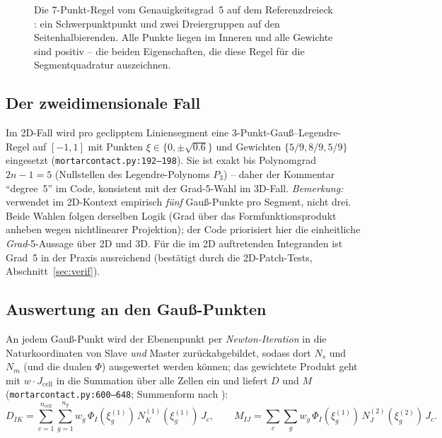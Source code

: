 \documentclass[a4paper,11pt]{article}
\def\bm#1{#1}%
\newcommand{\file}[1]{\texttt{\small #1}}
\begin{document}
\begin{figure}[htbp]
\centering
{}
\caption[7-Punkt-Regel vom Genauigkeitsgrad 5 auf dem Referenzdreieck]{Die 7-Punkt-Regel vom
Genauigkeitsgrad~5 auf dem Referenzdreieck \citep{dunavant1985}: ein Schwerpunktpunkt und zwei
Dreiergruppen auf den Seitenhalbierenden. Alle Punkte liegen im Inneren und alle Gewichte sind
positiv -- die beiden Eigenschaften, die diese Regel für die Segmentquadratur auszeichnen.}
\label{fig:dunavant}
\end{figure}

\subsection{Der zweidimensionale Fall}
Im 2D-Fall wird pro geclipptem Liniensegment eine 3-Punkt-Gauß--Legendre-Regel auf $[-1,1]$ mit
Punkten $\xi\in\{0,\pm\sqrt{0.6}\}$ und Gewichten $\{5/9,8/9,5/9\}$ eingesetzt
(\file{mortarcontact.py:\allowbreak{}192--198}). Sie ist exakt bis Polynomgrad $2n-1=5$ (Nullstellen des
Legendre-Polynoms $P_3$) -- daher der Kommentar ``degree~5'' im Code, konsistent mit der Grad-5-Wahl
im 3D-Fall. \emph{Bemerkung:} \citet{farah} verwendet im 2D-Kontext empirisch \emph{fünf}
Gauß-Punkte pro Segment, nicht drei. Beide Wahlen folgen derselben Logik (Grad über das
Formfunktionsprodukt anheben wegen nichtlinearer Projektion); der Code priorisiert hier die
einheitliche \emph{Grad}-5-Aussage über 2D und 3D. Für die im 2D auftretenden Integranden ist Grad~5
in der Praxis ausreichend (bestätigt durch die 2D-Patch-Tests, Abschnitt~\ref{sec:verif}).

\subsection{Auswertung an den Gauß-Punkten}
An jedem Gauß-Punkt wird der Ebenenpunkt per \emph{Newton-Iteration} in die Naturkoordinaten von
Slave \emph{und} Master zurückabgebildet, sodass dort $N_s$ und $N_m$ (und die dualen $\Phi$)
ausgewertet werden können; das gewichtete Produkt geht mit $w\cdot J_{\text{cell}}$ in die
Summation über alle Zellen ein und liefert $\bm D$ und $\bm M$ (\file{mortarcontact.py:\allowbreak{}600--648};
Summenform nach \citealt[Alg.~1, S.~215]{farah2015}):
\begin{equation}
\bm D_{IK} = \sum_{c=1}^{n_{\text{cell}}}\sum_{g=1}^{n_g} w_g\,
\Phi_I(\xi_g^{(1)})\,N_K^{(1)}(\xi_g^{(1)})\,J_c,
\qquad
\bm M_{IJ} = \sum_{c}\sum_{g} w_g\,
\Phi_I(\xi_g^{(1)})\,N_J^{(2)}(\xi_g^{(2)})\,J_c .
\end{equation}
\end{document}
